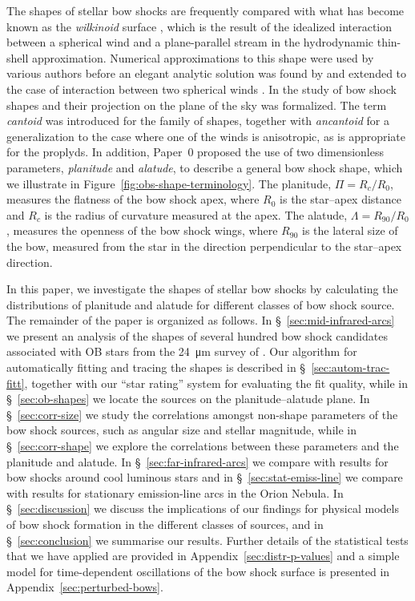 \documentclass[useAMS, usenatbib, a4paper]{mnras}
\begin{document}
The shapes of stellar bow shocks are frequently compared with what has
become known as the \textit{wilkinoid} surface \citep{Cox:2012a},
which is the result of the idealized interaction between a spherical
wind and a plane-parallel stream in the hydrodynamic thin-shell
approximation.  Numerical approximations to this shape were used by
various authors \citep{Baranov:1971a, Mac-Low:1991a} before an elegant
analytic solution was found by \citet{Wilkin:1996a} and extended to
the case of interaction between two spherical winds
\citep{Canto:1996}.  In \citet[hereafter, Paper~0]{Tarango-Yong:2018a}
the study of bow shock shapes and their projection on the plane of the
sky was formalized. The term \textit{cantoid} was introduced for the
\citet{Canto:1996} family of shapes, together with \textit{ancantoid}
for a generalization to the case where one of the winds is
anisotropic, as is appropriate for the proplyds.  In addition, Paper~0
proposed the use of two dimensionless parameters, \textit{planitude}
and \textit{alatude}, to describe a general bow shock shape, which we
illustrate in Figure~\ref{fig:obs-shape-terminology}.  The planitude,
\(\Pi = R_c / R_0\), measures the flatness of the bow shock apex, where
\(R_0\) is the star--apex distance and \(R_c\) is the radius of
curvature measured at the apex.  The alatude,
\(\Lambda = R_{90}/R_0\), measures the openness of the bow shock wings,
where \(R_{90}\) is the lateral size of the bow, measured from the
star in the direction perpendicular to the star--apex direction.

In this paper, we investigate the shapes of stellar bow shocks by
calculating the distributions of planitude and alatude for different
classes of bow shock source.  The remainder of the paper is organized
as follows. In \S~\ref{sec:mid-infrared-arcs} we present an analysis
of the shapes of several hundred bow shock candidates associated with
OB stars from the \SI{24}{\um} survey of \citet{Kobulnicky:2016a}.
Our algorithm for automatically fitting and tracing the shapes is
described in \S~\ref{sec:autom-trac-fitt}, together with our ``star
rating'' system for evaluating the fit quality, while in
\S~\ref{sec:ob-shapes} we locate the sources on the planitude--alatude
plane.  In \S~\ref{sec:corr-size} we study the correlations amongst
non-shape parameters of the bow shock sources, such as angular size
and stellar magnitude, while in \S~\ref{sec:corr-shape} we explore the
correlations between these parameters and the planitude and alatude.  In
\S~\ref{sec:far-infrared-arcs} we compare with results for bow shocks
around cool luminous stars and in \S~\ref{sec:stat-emiss-line} we
compare with results for stationary emission-line arcs in the Orion
Nebula.  In \S~\ref{sec:discussion} we discuss the implications of our
findings for physical models of bow shock formation in the different
classes of sources, and in \S~\ref{sec:conclusion} we summarise our
results.  Further details of the statistical tests that we have
applied are provided in Appendix~\ref{sec:distr-p-values} and a simple
model for time-dependent oscillations of the bow shock surface is
presented in Appendix~\ref{sec:perturbed-bows}.
\end{document}
